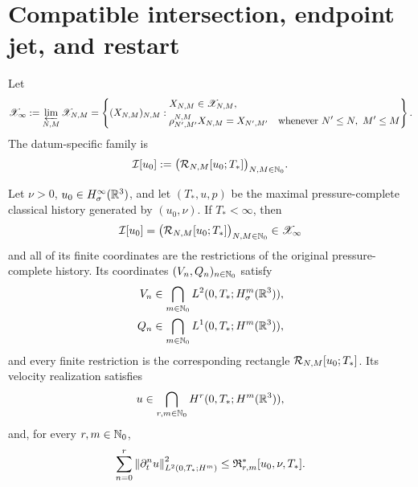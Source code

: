 \section{Compatible intersection, endpoint jet, and restart}

\begin{definition}
\label{def:compatible-intersection}
Let
\begin{equation}
 \mathscr X_\infty
 :=\varprojlim_{N,M}\mathscr X_{N,M}
 =\left\{(X_{N,M})_{N,M}:
 \begin{aligned}
 &X_{N,M}\in\mathscr X_{N,M},\\
 &\rho_{N',M'}^{N,M}X_{N,M}=X_{N',M'}
 \quad\text{whenever }N'\le N,\ M'\le M
 \end{aligned}
 \right\}.
 \label{eq:compatible-intersection-space}
\end{equation}
The datum-specific family is
\begin{equation}
 \mathcal I[u_0]
 :=\bigl(\mathcal R_{N,M}[u_0;T_*]\bigr)_{N,M\in\mathbb N_0}.
 \label{eq:compatible-intersection}
\end{equation}
\end{definition}

\begin{theorem}
\label{thm:compatible-inverse-intersection}
Let \(\nu>0\), \(u_0\in H^\infty_\sigma(\mathbb R^3)\), and let
\((T_*,u,p)\) be the maximal pressure-complete classical history generated
by \((u_0,\nu)\).  If \(T_*<\infty\), then
\begin{equation}
 \mathcal I[u_0]
 =\bigl(\mathcal R_{N,M}[u_0;T_*]\bigr)_{N,M\in\mathbb N_0}
 \in\mathscr X_\infty
 \label{eq:ier-compatible-family}
\end{equation}
and all of its finite coordinates are the restrictions of the original pressure-complete history.  Its coordinates \((V_n,Q_n)_{n\in\mathbb N_0}\)
satisfy
\begin{align}
 V_n&\in\bigcap_{m\in\mathbb N_0}L^2(0,T_*;H^m_\sigma(\mathbb R^3)),
 \label{eq:ier-inverse-velocity-coordinate}\\
 Q_n&\in\bigcap_{m\in\mathbb N_0}L^1(0,T_*;H^m(\mathbb R^3)),
 \label{eq:ier-inverse-pressure-coordinate}
\end{align}
and every finite restriction is the corresponding rectangle
\(\mathcal R_{N,M}[u_0;T_*]\).  Its velocity realization satisfies
\begin{equation}
 u\in\bigcap_{r,m\in\mathbb N_0}H^r(0,T_*;H^m(\mathbb R^3)),
 \label{eq:mixed-sobolev-intersection}
\end{equation}
and, for every \(r,m\in\mathbb N_0\),
\begin{equation}
 \sum_{n=0}^{r}\left\lVert \partial_t^nu\right\rVert_{L^2(0,T_*;H^m)}^2
 \le\mathfrak R_{r,m}^*[u_0,\nu,T_*].
 \label{eq:mixed-sobolev-finite-bound}
\end{equation}
\end{theorem}

